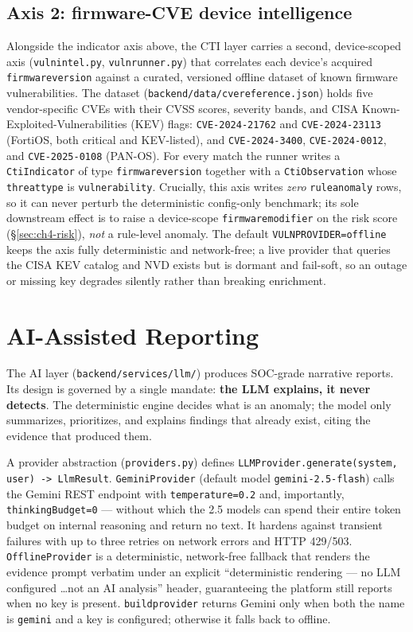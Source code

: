 \documentclass[12pt,a4paper]{report}
\renewcommand{\_}{\textunderscore\allowbreak}
\begin{document}
\subsection*{Axis 2: firmware-CVE device intelligence}

Alongside the indicator axis above, the CTI layer carries a second, device-scoped axis (\texttt{vuln\_intel.py}, \texttt{vuln\_runner.py}) that correlates each device's acquired \texttt{firmware\_version} against a curated, versioned offline dataset of known firmware vulnerabilities. The dataset (\texttt{backend/data/cve\_reference.json}) holds five vendor-specific CVEs with their CVSS scores, severity bands, and CISA Known-Exploited-Vulnerabilities (KEV) flags: \texttt{CVE-2024-21762} and \texttt{CVE-2024-23113} (FortiOS, both critical and KEV-listed), and \texttt{CVE-2024-3400}, \texttt{CVE-2024-0012}, and \texttt{CVE-2025-0108} (PAN-OS). For every match the runner writes a \texttt{CtiIndicator} of type \texttt{firmware\_version} together with a \texttt{CtiObservation} whose \texttt{threat\_type} is \texttt{vulnerability}. Crucially, this axis writes \emph{zero} \texttt{rule\_anomaly} rows, so it can never perturb the deterministic config-only benchmark; its sole downstream effect is to raise a device-scope \texttt{firmware\_modifier} on the risk score (\S\ref{sec:ch4-risk}), \emph{not} a rule-level anomaly. The default \texttt{VULN\_PROVIDER=offline} keeps the axis fully deterministic and network-free; a live provider that queries the CISA KEV catalog and NVD exists but is dormant and fail-soft, so an outage or missing key degrades silently rather than breaking enrichment.

\section{AI-Assisted Reporting}
\label{sec:ch4-llm}

The AI layer (\texttt{backend/services/llm/}) produces SOC-grade narrative reports. Its design is governed by a single mandate: \textbf{the LLM explains, it never detects}. The deterministic engine decides what is an anomaly; the model only summarizes, prioritizes, and explains findings that already exist, citing the evidence that produced them.

A provider abstraction (\texttt{providers.py}) defines \texttt{LLMProvider.generate(system, user) -> LlmResult}. \texttt{GeminiProvider} (default model \texttt{gemini-2.5-flash}) calls the Gemini REST endpoint with \texttt{temperature=0.2} and, importantly, \texttt{thinkingBudget=0} --- without which the 2.5 models can spend their entire token budget on internal reasoning and return no text. It hardens against transient failures with up to three retries on network errors and HTTP 429/503. \texttt{OfflineProvider} is a deterministic, network-free fallback that renders the evidence prompt verbatim under an explicit ``deterministic rendering --- no LLM configured \dots not an AI analysis'' header, guaranteeing the platform still reports when no key is present. \texttt{build\_provider} returns Gemini only when both the name is \texttt{gemini} and a key is configured; otherwise it falls back to offline.
\end{document}
